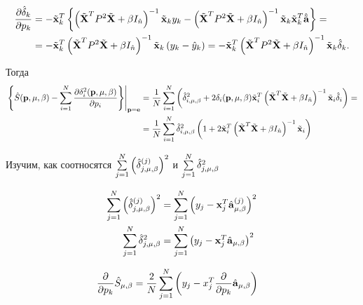\begin{align}
	\dd{\hat\delta_k}{p_k}
	&= - \tilde {\mb x}_k^T
	\fbr{
		\inv{\tilde{\mb X}^T P^2\tilde{\mb X} + \beta I_{\hat n}}
		\tilde{\mb x}_ky_k
		-
		\inv{\tilde{\mb X}^T P^2\tilde{\mb X} + \beta I_{\hat n}}
		\tilde{\mb x}_k \tilde{\mb x}^T_k
		\besta
	} = \\
	&= -\tilde {\mb x}_k^T
		\inv{\tilde{\mb X}^T P^2\tilde{\mb X} + \beta I_{\hat n}}
		\tilde{\mb x}_k \cbr{y_k - \hat y_k}
	= - \tilde {\mb x}_k^T
		\inv{\tilde{\mb X}^T P^2\tilde{\mb X} + \beta I_{\hat n}}
		\tilde{\mb x}_k \hat \delta_k.
\end{align}

Тогда
\begin{align}
	\left.\fbr{
		\hat S(\mb p, \lams)
	- 	\suml_{i=1}^N\dd{\delta_i^2(\mb p, \lams)}{p_i}
	}\right|_{\mb p=\mb e}
	&= 	\frac1N\suml_{i=1}^N
		\cbr{
			\hat \delta_{i, \lams}^2
		+ 	2 \delta_i(\mb p, \lams)
			\tilde {\mb x}_i^T
			\inv{\tilde{\mb X}^T \tilde{\mb X} + \beta I_{\hat n}}
			\tilde{\mb x}_i \hat \delta_i
		} = \\
	&= 	\frac1N\suml_{i=1}^N
			\hat \delta_{i, \lams}^2
		\cbr{
			1
		+ 	2
			\tilde {\mb x}_i^T
			\inv{\tilde{\mb X}^T \tilde{\mb X} + \beta I_{\hat n}}
			\tilde{\mb x}_i
		}
\end{align}

Изучим, как соотносятся
$\suml_{j=1}^N\sqr{\hat{\delta}_{j, \lams}^{(j)}}$
и $\suml_{j=1}^N \hat\delta_{j, \lams}^2$

\begin{align}
	\suml_{j=1}^N\sqr{\hat{\delta}_{j, \lams}^{(j)}} &=
		\suml_{j=1}^N\sqr{y_j - \mb x_j^T \hat {\mb a}_\lams^{(j)}} \\
	\suml_{j=1}^N \hat\delta_{j, \lams}^2 &=
		\suml_{j=1}^N \sqr{y_j - \mb x_j^T \hat {\mb a}_\lams}
\end{align}


\begin{align}
	\dd{}{p_k}\hat{S}_{\lams}&= \frac2N\sum_{j=1}^N\cbr{y_j - x_j^T \dd{}{p_k}\hat {\mb a}_{\lams}}
\end{align}

